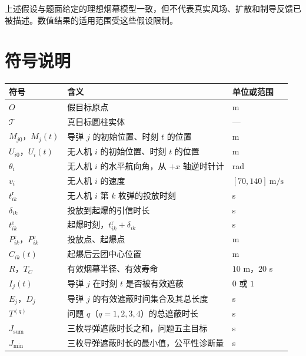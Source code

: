 上述假设与题面给定的理想烟幕模型一致，但不代表真实风场、扩散和制导反馈已被描述。数值结果的适用范围受这些假设限制。

\section{符号说明}

\begin{center}
\small
\setlength{\tabcolsep}{3pt}
\renewcommand{\arraystretch}{1.18}
\begin{tabularx}{\linewidth}{|X|X|X|}
\hline
\rowcolor{gray!15} \textbf{符号} & \textbf{含义} & \textbf{单位或范围} \\
\hline
$O$ & 假目标原点 & m \\
\hline
$\mathcal T$ & 真目标圆柱实体 & — \\
\hline
$M_{j0}$，$M_j(t)$ & 导弹 $j$ 的初始位置、时刻 $t$ 的位置 & m \\
\hline
$U_{i0}$，$U_i(t)$ & 无人机 $i$ 的初始位置、时刻 $t$ 的位置 & m \\
\hline
$\theta_i$ & 无人机 $i$ 的水平航向角，从 $+x$ 轴逆时针计 & rad \\
\hline
$v_i$ & 无人机 $i$ 的速度 & $[70,\allowbreak{}140]\ \mathrm{m/s}$ \\
\hline
$t_{ik}^{\mathrm r}$ & 无人机 $i$ 第 $k$ 枚弹的投放时刻 & s \\
\hline
$\delta_{ik}$ & 投放到起爆的引信时长 & s \\
\hline
$t_{ik}^{\mathrm e}$ & 起爆时刻，$t_{ik}^{\mathrm r}+\delta_{ik}$ & s \\
\hline
$P_{ik}^{\mathrm r}$，$P_{ik}^{\mathrm e}$ & 投放点、起爆点 & m \\
\hline
$C_{ik}(t)$ & 起爆后云团中心位置 & m \\
\hline
$R$，$T_C$ & 有效烟幕半径、有效寿命 & $10$ m，$20$ s \\
\hline
$I_j(t)$ & 导弹 $j$ 在时刻 $t$ 是否被有效遮蔽 & $0$ 或 $1$ \\
\hline
$E_j$，$D_j$ & 导弹 $j$ 的有效遮蔽时间集合及其总长度 & s \\
\hline
$T^{(q)}$ & 问题 $q$（$q=1,2,3,4$）的总遮蔽时长 & s \\
\hline
$J_{\mathrm{sum}}$ & 三枚导弹遮蔽时长之和，问题五主目标 & s \\
\hline
$J_{\min}$ & 三枚导弹遮蔽时长的最小值，公平性诊断量 & s \\
\hline
\end{tabularx}
\end{center}

